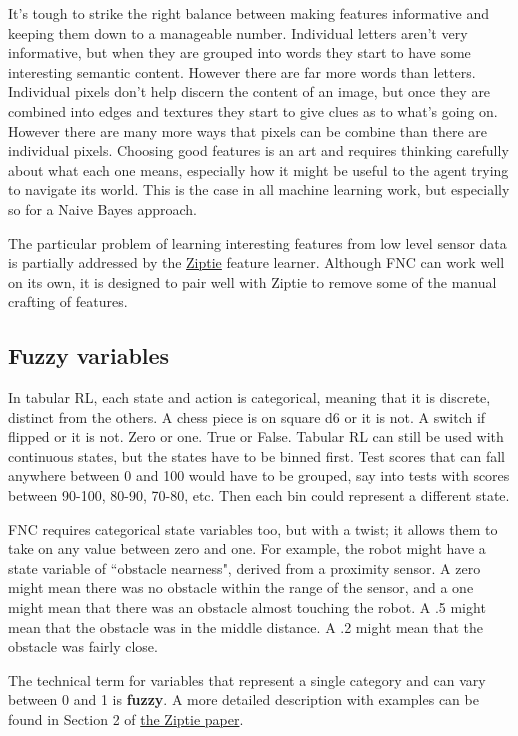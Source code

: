 It's tough to strike the right balance between making features informative
and keeping them down to a manageable number. Individual letters aren't
very informative, but when they are grouped into words they start to
have some interesting semantic content. However there are far more
words than letters. Individual pixels don't help discern the content of
an image, but once they are combined into edges and textures
they start to give clues as to what's going on. However there are many
more ways that pixels can be combine than there are individual pixels.
Choosing good features is an art and requires thinking carefully about
what each one means, especially how it might be useful to the agent trying
to navigate its world. This is the case in all machine learning work,
but especially so for a Naive Bayes approach.

The particular problem of learning interesting features from low level
sensor data is partially addressed by the
\href{https://brandonrohrer.com/ziptie}{Ziptie} feature learner. Although
FNC can work well on its own, it is designed to pair well with Ziptie
to remove some of the manual crafting of features.

\subsection{Fuzzy variables}
\label{introfuzzy}
In tabular RL, each state and action is categorical, meaning that
it is discrete, distinct from the others. A chess piece is on
square d6 or it is not. A switch if flipped or it is not. Zero or one.
True or False. Tabular RL can still be used with continuous states,
but the states have to be binned first. Test scores that can fall
anywhere between 0 and 100 would have to be grouped, say into tests
with scores between 90-100, 80-90, 70-80, etc. Then each bin could
represent a different state.

FNC requires categorical state variables too, but with a twist;
it allows them to take on any value between zero and one.
For example, the robot might have a state variable of ``obstacle nearness",
derived from a proximity sensor. A zero might mean there was no obstacle
within the range of the sensor, and a one might mean that there was
an obstacle almost touching the robot. A .5 might mean that the obstacle was
in the middle distance. A .2 might mean that the obstacle was fairly close.

The technical term for variables that represent a single category and
can vary between 0 and 1 is \textbf{fuzzy}. A more detailed description
with examples can be found in Section 2
of \href{https://brandonrohrer.com/ziptie}{the Ziptie paper}.






